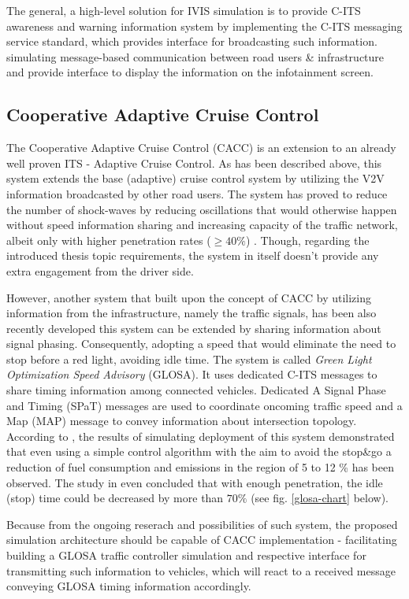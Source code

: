 \documentclass[main.tex]{subfiles}
\begin{document}
The general, a high-level solution for IVIS simulation is to provide C-ITS awareness and warning information system by 
implementing the C-ITS messaging service standard, which provides interface for broadcasting such information.
 simulating message-based communication between road users \& infrastructure and provide interface to display the 
information on the infotainment screen.

\subsection{Cooperative Adaptive Cruise Control}

The Cooperative Adaptive Cruise Control (CACC) is an extension to an already well proven ITS -
Adaptive Cruise Control.  As has been described above, this system extends the base (adaptive)
cruise control system by utilizing the V2V information broadcasted by other road users. The
system has proved to reduce the number of shock-waves by reducing oscillations that would
otherwise happen without speed information sharing and increasing capacity of the traffic
network, albeit only with higher penetration rates ($\ge 40\%$) \cite{van_Arem_2006}. Though,
regarding the introduced thesis topic requirements, the system in itself doesn't provide any
extra engagement from the driver side. 

However, another system that built upon the concept of CACC by utilizing information from the
infrastructure, namely the traffic signals, has been also recently developed this system can be
extended by sharing information about signal phasing. Consequently, adopting a speed that would
eliminate the need to stop before a red light, avoiding idle time. The system is called
\emph{Green Light Optimization Speed Advisory} (GLOSA). It uses dedicated C-ITS messages to 
share timing information among connected vehicles. Dedicated A Signal Phase and Timing (SPaT) messages 
are used to coordinate oncoming traffic speed and a Map (MAP) message to convey information 
about intersection topology. According to \cite{Pariota_2019}, the results 
of simulating deployment of this system demonstrated that even using a simple
control algorithm with the aim to avoid the stop\&go a reduction of fuel consumption
and emissions in the region of 5 to 12 \% has been observed. The study in \cite{Katsaros_2011} even 
concluded that with enough penetration, the idle (stop) time could be decreased by more than $70 \%$ 
(see fig. \ref{glosa-chart} below).

Because from the ongoing reserach and possibilities of such system, the proposed simulation architecture 
should be capable of CACC implementation - facilitating building a GLOSA traffic controller simulation
and respective interface for transmitting such information to vehicles, which will react to a received 
message conveying GLOSA timing information accordingly. 
\end{document}
